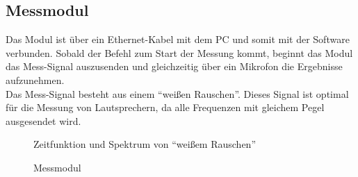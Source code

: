 \newpage
\subsection{Messmodul}\label{subsec:5.2.2}
Das Modul ist über ein Ethernet-Kabel mit dem PC und somit mit der Software verbunden. Sobald der Befehl zum Start der Messung kommt, beginnt das Modul das Mess-Signal auszusenden und gleichzeitig über ein Mikrofon die Ergebnisse aufzunehmen.\\
Das Mess-Signal besteht aus einem \enquote{weißen Rauschen}. Dieses Signal ist optimal für die Messung von Lautsprechern, da alle Frequenzen mit gleichem Pegel ausgesendet wird.
\begin{figure} [H]
	\centering
	\caption{Zeitfunktion und Spektrum von \enquote{weißem Rauschen}}
	\label{fig:5.2.2.1}
\end{figure}
\begin{figure} [H]
	\centering
	\caption{Messmodul}
	\label{fig:5.2.2.2}
\end{figure}

